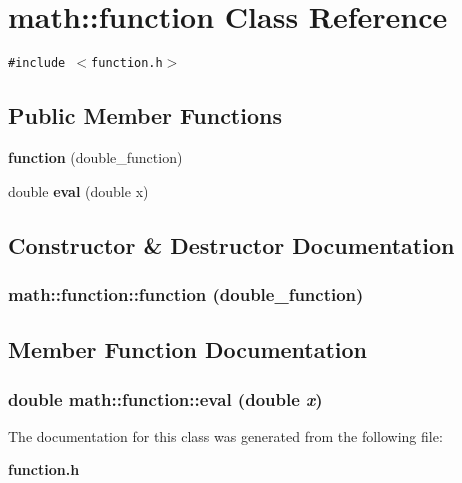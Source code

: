 \section{math::function Class Reference}
\label{classmath_1_1function}
{\tt \#include $<$function.h$>$}

\subsection*{Public Member Functions}
\begin{CompactItemize}
\item 
{\bf function} (double\_\-function)
\item 
double {\bf eval} (double x)
\end{CompactItemize}


\subsection{Constructor \& Destructor Documentation}
\subsubsection[{function}]{\setlength{\rightskip}{0pt plus 5cm}math::function::function (double\_\-function)}\label{classmath_1_1function_028c82775618558d822f899271c4f2e4}




\subsection{Member Function Documentation}
\subsubsection[{eval}]{\setlength{\rightskip}{0pt plus 5cm}double math::function::eval (double {\em x})}\label{classmath_1_1function_3fb0c1f7c3b7b219dc37285853e9a2ac}




The documentation for this class was generated from the following file:\begin{CompactItemize}
\item 
{\bf function.h}\end{CompactItemize}
